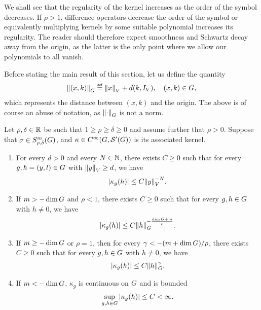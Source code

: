 We shall see that the regularity of the kernel increases
as the order of the symbol decreases.
If $\rho > 1$, difference operators decrease the order of the symbol
or equivalently multiplying kernels by some suitable polynomial increases its regularity.
The reader should therefore expect smoothness and Schwartz decay away from the origin,
as the latter is the only point where we allow our polynomials to all vanish.

Before stating the main result of this section,
let us define the quantity
\begin{align*}
    \norm [\Group] {(x, k)} \defeq \norm {x} + d(k, \Id{\VectorSpace}), \quad (x, k) \in \Group,
\end{align*}
which represents the distance between $(x, k)$ and the origin.
The above is of course an abuse of notation, as $\norm [\Group] \dummy$ is not a norm.

\begin{theorem}
\label{theorem:kernel_estimates}
    Let $\rho, \delta \in \R$ be such that $1 \geq \rho \geq \delta \geq 0$
    and assume further that $\rho > 0$.
    Suppose that $\sigma \in \SymbolClass{m}{\rho, \delta}$,
    and $\kappa \in \SmoothFunctions {\Group, \TemperedDistributions \Group}$ is its associated kernel.
    \begin{enumerate}
        \item \label{item:kernel_estimates:at_infinity}
            For every $d > 0$ and every $N \in \N$,
            there exists $C \geq 0$ such that for every $g, h = (y, l) \in \Group$ with $\norm {y} \geq d$, we have
            \begin{align*}
                \abs{\kappa_g(h)} \leq C \norm y^{-N}.
            \end{align*}
        \item \label{item:kernel_estimates:at_origin:positive}
            If $m > - \dim \Group$ and $\rho < 1$, there exists $C \geq 0$ such that for every $g, h \in \Group$ with $h \neq 0$, we have
            \begin{align*}
                \abs{\kappa_g(h)} \leq C \norm [\Group] h^{- \frac{\dim \Group + m}{\rho}}.
            \end{align*}
        \item \label{item:kernel_estimates:at_origin:zero}
            If $m \geq -\dim \Group$ or $\rho = 1$,
            then for every $\gamma < -(m + \dim \Group)/\rho$,
            there exists $C \geq 0$ such that for every $g, h \in \Group$ with $h \neq 0$, we have
            \begin{align*}
                \abs{\kappa_g(h)} \leq C \norm [\Group] h^\gamma.
            \end{align*}
        \item \label{item:kernel_estimates:at_origin:negative}
            If $m < -\dim \Group$, $\kappa_g$ is continuous on $\Group$ and is bounded
            \begin{align*}
                \sup_{g, h \in \Group} \abs{\kappa_g(h)} \leq C < \infty.
            \end{align*}
    \end{enumerate}
\end{theorem}


